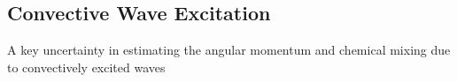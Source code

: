 {\color{purple}
\subsection{Convective Wave Excitation}
}

A key uncertainty in estimating the angular momentum and chemical mixing due to convectively excited waves 

